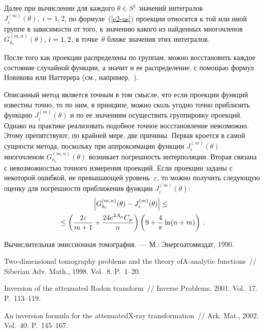 \begin{multicols}{2}
Далее при вычислении для каждого $\theta\in S^1$ значений интегралов
$J^{(m)}_i(\theta),\;i=1,2$, по формуле~(\ref{e2-us}) 
проекции относятся к той или иной группе в зависимости от того, к значению
какого из найденных многочленов $G^{(m,n)}_{h_i}(\theta)$,
$i\hm=1,2$, в точке~$\theta$ ближе значения этих интегралов.

После того как проекции распределены по группам, можно восстановить
каждое состояние случайной функции, а значит и ее распределение, 
с помощью формул Новикова или Наттерера (см., например,~\cite{4-us, 3-us}).

Описанный метод является точным в том смыс\-ле, что если проекции
функций известны точно, то по ним, в принципе, можно сколь угодно
точно приблизить функцию $J^{(m)}_i(\theta)$ и по ее
значениям осуществить группировку проекций. Однако на практике
реализовать подобное точное вос\-ста\-нов\-ле\-ние невозможно. Этому
препятствуют, по крайней мере, две причины. Первая кроется в самой
сущности метода, поскольку при аппроксимации функции $J^{(m)}_i(\theta)$ 
многочленом $G^{(m,n)}_{h_i}(\theta)$ возникает погрешность интерполяции. Вторая связана с
невозможностью точного измерения проекций. Если проекции заданы с
некоторой ошибкой, не превышающей уровень~$\varepsilon$, то можно
получить следующую оценку для погрешности 
приближения функции $J^{(m)}_i(\theta)$:
\begin{multline*}
\left\vert G^{(m,n)}_{h_i}(\theta)-J^{(m)}_i(\theta)\right\vert\leq{}\\
{}\leq
\left(\displaystyle\frac{\displaystyle 2\varepsilon\mathstrut}{\displaystyle m+1\mathstrut}+\displaystyle\frac{\displaystyle 24e^{2A_\mu}C_\mu\mathstrut}{\displaystyle n\mathstrut}\right)\left(9+\displaystyle\frac{\displaystyle 4\mathstrut}{\displaystyle \pi\mathstrut}\ln(n+m)\right)\,.
\end{multline*}

{\small\frenchspacing
{%
\begin{thebibliography}{99}
Вычислительная эмиссионная томография.~--- М.: Энергоатомиздат, 1990.
\par
{}
Two-dimensional tomogra\-phy problems and the theory of\linebreak A-analytic
functions~// Siberian Adv. Math., 1998. Vol.~8. P.~1--20.


 Inversion of the attenuated Radon transform~//
Inverse Problems, 2001. Vol.~17. P.~113--119.

An inversion formula for the attenuated\linebreak X-ray
transformation~// Ark. Mat., 2002. Vol.~40. P.~145--167.


\end{thebibliography}}}
\end{multicols}
